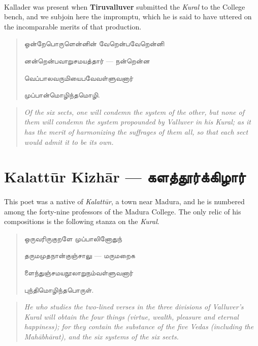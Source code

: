 \documentclass{article}
\newcommand{\TamilText}[1]{\texttamil{#1}}
\newcommand{\TamilBold}[1]{\texttamil{\textbf{#1}}}
\newcommand{\tam}[1]{\TamilText{#1}}
\newcommand{\tambold}[1]{\TamilBold{#1}}
\begin{document}
\paragraph{}
Kallader was present when \textbf{Tiruvalluver} submitted the \emph{Kural} to the College bench, and we subjoin here the impromptu, which he is said to have uttered on the incomparable merits of that production.
\begin{quotation}\small
\tam{ஒன்றேபொருளென்னின்‌ வேறென்பவேறென்னி}

\tam{னன்றென்பவாறுசமயத்தார்‌} --- \tam{நன்றென்ன}

\tam{வெப்பாலவருமியைபவேவள்ளுவனார்‌}

\tam{முப்பான்மொழிந்தமொழி}.
\end{quotation}
\begin{quotation}\small
\emph{Of the six sects, one will condemn the system of the other, but none of them will condemn the system propounded by Valluver in his Kural; as it has the merit of harmonizing the suffrages of them all, so that each sect would admit it to be its own.}
\end{quotation}

\section{Kalatt\={u}r Kizh\={a}r --- \tambold{களத்தூர்க்கிழார்}}
\paragraph{}
This poet was a native of \emph{Kalatt\={u}r}, a town near Madura, and he is numbered among the forty-nine professors of the Madura College. The only relic of his compositions is the following stanza on the \emph{Kural}.
\begin{quotation}\small
\tam{ஒருவரிருகுறளே முப்பாலினோதுந்}

\tam{தருமமுதநான்குஞ்சாலு} --- \tam{மருமறைக}

\tam{ளைந்துஞ்சமயநூலாறுநம்வள்‌ளுவனார்‌}

\tam{புந்திமொழிந்தபொருள்‌}.
\end{quotation}
\begin{quotation}\small
\emph{He who studies the two-lined verses in the three divisions of Valluver's Kural will obtain the four things (virtue, wealth, pleasure and eternal happiness); for they contain the substance of the five Vedas (including the Mah\={a}bh\={a}rat), and the six systems of the six sects.}
\end{quotation}
\end{document}
